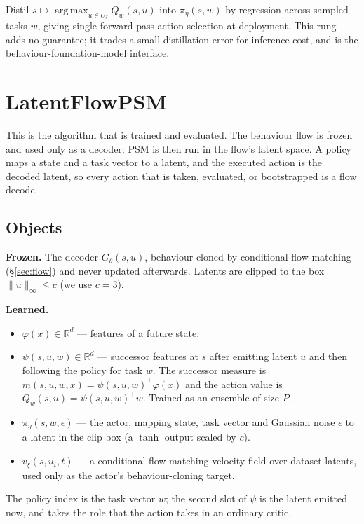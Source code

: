\documentclass[11pt]{article}
\theoremstyle{plain}
\theoremstyle{definition}
\theoremstyle{remark}
\newcommand{\R}{\mathbb R}
\newcommand{\1}{\mathbf 1}
\newcommand{\argmax}{\operatorname*{arg\,max}}
\newcommand{\Gth}{G_\theta}
\newcommand{\Udelta}{U_\delta}
\begin{document}
Distil $s\mapsto\argmax_{u\in\Udelta}Q_w(s,u)$ into $\pi_\eta(s,w)$ by regression across
sampled tasks $w$, giving single-forward-pass action selection at deployment. This rung
adds no guarantee; it trades a small distillation error for inference cost, and is the
behaviour-foundation-model interface.

\section{LatentFlowPSM}
\label{sec:latentflowpsm}

This is the algorithm that is trained and evaluated. The behaviour flow is frozen and used
only as a decoder; PSM is then run in the flow's latent space. A policy maps a state and a
task vector to a latent, and the executed action is the decoded latent, so every action
that is taken, evaluated, or bootstrapped is a flow decode.

\subsection{Objects}

\textbf{Frozen.} The decoder $\Gth(s,u)$, behaviour-cloned by conditional flow matching
(\S\ref{sec:flow}) and never updated afterwards. Latents are clipped to the box
$\|u\|_\infty\le c$ (we use $c=3$).

\textbf{Learned.}
\begin{itemize}
\item $\varphi(x)\in\R^{d}$ --- features of a future state.
\item $\psi(s,u,w)\in\R^{d}$ --- successor features at $s$ after emitting latent $u$ and
      then following the policy for task $w$. The successor measure is
      $m(s,u,w,x)=\psi(s,u,w)^\top\varphi(x)$ and the action value is
      $Q_w(s,u)=\psi(s,u,w)^\top w$. Trained as an ensemble of size $P$.
\item $\pi_\eta(s,w,\epsilon)$ --- the actor, mapping state, task vector and Gaussian
      noise $\epsilon$ to a latent in the clip box (a $\tanh$ output scaled by $c$).
\item $v_\xi(s,u_t,t)$ --- a conditional flow matching velocity field over dataset
      latents, used only as the actor's behaviour-cloning target.
\end{itemize}

The policy index is the task vector $w$; the second slot of $\psi$ is the latent emitted
now, and takes the role that the action takes in an ordinary critic.
\end{document}

